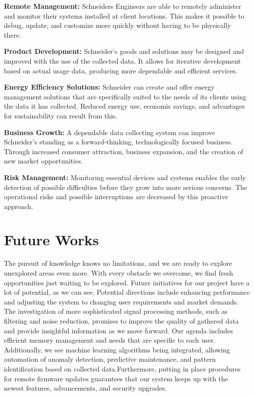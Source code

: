 \textbf{Remote Management:} Schneiders Engineers are able to remotely administer and monitor their systems installed at client locations. This makes it possible to debug, update, and customize more quickly without having to be physically there.
\par

\textbf{Product Development:} Schneider's goods and solutions may be designed and improved with the use of the collected data. It allows for iterative development based on actual usage data, producing more dependable and efficient services.
\par

\textbf{Energy Efficiency Solutions:} Schneider can create and offer energy management solutions that are specifically suited to the needs of its clients using the data it has collected. Reduced energy use, economic savings, and advantages for sustainability can result from this.
\par

\textbf{Business Growth:} A dependable data collecting system can improve Schneider's standing as a forward-thinking, technologically focused business. Through increased consumer attraction, business expansion, and the creation of new market opportunities.
\par

\textbf{Risk Management:} Monitoring essential devices and systems enables the early detection of possible difficulties before they grow into more serious concerns. The operational risks and possible interruptions are decreased by this proactive approach.
\par

\section{Future Works} 
The pursuit of knowledge knows no limitations, and we are ready to explore unexplored areas even more. With every obstacle we overcome, we find fresh opportunities just waiting to be explored. Future initiatives for our project have a lot of potential, as we can see. Potential directions include enhancing performance and adjusting the system to changing user requirements and market demands. The investigation of more sophisticated signal processing methods, such as filtering and noise reduction, promises to improve the quality of gathered data and provide insightful information as we move forward. Our agenda includes efficient memory management and needs that are specific to each user. Additionally, we see machine learning algorithms being integrated, allowing automation of anomaly detection, predictive maintenance, and pattern identification based on collected data.Furthermore, putting in place procedures for remote firmware updates guarantees that our system keeps up with the newest features, advancements, and security upgrades.

